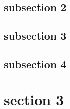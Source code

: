\documentclass{beamer}
\begin{document}
\subsection{subsection 2}
\begin{frame}\end{frame}

\subsection{subsection 3}
\begin{frame}\end{frame}

\subsection{subsection 4}
\begin{frame}\end{frame}

\section{section 3}
\begin{frame}\end{frame}
\end{document}
